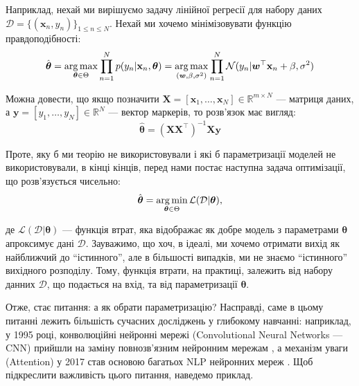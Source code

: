 \begin{example}
	Наприклад, нехай ми вирішуємо задачу лінійної регресії для набору даних
	$\mathcal{D} = \{(\mathbf{x}_n, y_n)\}_{1 \leq n \leq N}$. Нехай ми хочемо 
	мінімізовувати функцію правдоподібності:
	\begin{equation}
		\hat{\boldsymbol{\theta}} = \operatorname*{arg\,max}_{\boldsymbol{\theta} \in \Theta} \prod_{n=1}^N p(y_n|\mathbf{x}_n,\boldsymbol{\theta}) = \operatorname*{arg\,max}_{(\boldsymbol{w},\beta,\sigma^2)}\prod_{n=1}^N \mathcal{N}(y_n|\boldsymbol{w}^{\top}\mathbf{x}_n+\beta,\sigma^2)
	\end{equation}

	Можна довести, що якщо позначити $\mathbf{X} = [\mathbf{x}_1,\dots,\mathbf{x}_N] \in \mathbb{R}^{m \times N}$ --- матриця даних, а $\mathbf{y} = [y_1,\dots,y_N] \in \mathbb{R}^N$ --- вектор маркерів, то розв'язок має вигляд:
	\begin{equation}
		\hat{\boldsymbol{\theta}} = (\mathbf{X}\mathbf{X}^{\top})^{-1}\mathbf{X}\mathbf{y}
	\end{equation}
\end{example}

Проте, яку б ми теорію не використовували і які б параметризації моделей не
використовували, в кінці кінців, перед нами постає наступна задача оптимізації, що
розв'язується чисельно:
\begin{equation}
	\hat{\boldsymbol{\theta}} = \operatorname*{arg\,min}_{\boldsymbol{\theta} \in \Theta} \mathcal{L}(\mathcal{D}|\boldsymbol{\theta}),
\end{equation}

де $\mathcal{L}(\mathcal{D}|\boldsymbol{\theta})$ --- функція втрат, яка
відображає як добре модель з параметрами $\boldsymbol{\theta}$ апроксимує дані
$\mathcal{D}$. Зауважимо, що хоч, в ідеалі, ми хочемо отримати вихід як
найближчий до ``істинного'', але в більшості випадків, ми не знаємо
``істинного'' вихідного розподілу. Тому, функція втрати, на практиці, 
залежить від набору данних $\mathcal{D}$, що подається на вхід, та від
параметризації $\boldsymbol{\theta}$.

Отже, стає питання: а як обрати параметризацію? Насправді, саме в цьому питанні
лежить більшість сучасних досліджень у глибокому навчанні: наприклад, у 1995
році, конволюційні нейронні мережі (Convolutional Neural Networks --- CNN)
прийшли на заміну повнозв'язним нейронним мережам \cite{lecun}, а механізм уваги
(Attention) у 2017 став основою багатьох NLP нейронних мереж \cite{attention}.
Щоб підкреслити важливість цього питання, наведемо приклад.

